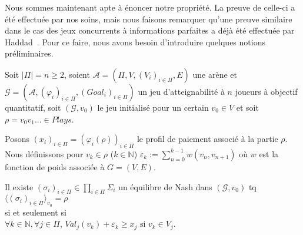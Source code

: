 Nous sommes maintenant apte à énoncer notre propriété. La preuve de celle-ci a été effectuée par nos soins, mais nous faisons remarquer qu'une preuve similaire dans le cas des jeux concurrents à informations parfaites a déjà été effectuée par Haddad~\cite{characNashEq}. Pour ce faire, nous avons besoin d'introduire quelques notions préliminaires.

\begin{propriete}
	\label{prop:rechEqpert1}
	Soit $|\Pi| = n \geq 2$,
	soient $\mathcal{A} = (\Pi, V, (V_{i})_{i\in\Pi}, E)$ une arène et $\mathcal{G} = (\mathcal{A}, (\varphi _{i})_{i\in\Pi}, (Goal_{i})_{i\in\Pi})$ un jeu d'atteignabilité à $n$ joueurs à objectif quantitatif, soit $(\mathcal{G}, v_{0})$ le jeu initialisé pour un certain $v_{0} \in V $ et soit $\rho = v_{0}v_{1}... \in Plays$. 
	
	Posons $(x_{i})_{i\in\Pi} = (\varphi _{i}(\rho))_{i\in\Pi}$ le profil de paiement associé à la partie $\rho$. Nous définissons pour $v_{k} \in \rho$ ($k \in \mathbb{N}$)  $\varepsilon _{k} := \sum _{n= 0} ^{k-1} w(v_{n},v_{n+1})$ où $w$ est la fonction de poids associée à $G = (V,E)$.
	
	\begin{center}Il existe $ (\sigma _{i})_{i\in\Pi} \in \prod_{i\in\Pi} \Sigma _{i}$ un équilibre de Nash dans $(\mathcal{G},v_{0})$ tq $\langle (\sigma _{i})_{i \in \Pi}\rangle_{v_0} = \rho$\\ $\text{}$\\ si et seulement si\\$\text{}$\\  $ \forall k \in \mathbb{N}, \forall j \in \Pi$, $Val_{j}(v_{k}) + \varepsilon _{k} \geq x_j \text{  si } v_{k} \in V_{j}$.\end{center}
	
\end{propriete}

\setcounter{equation}{0}

